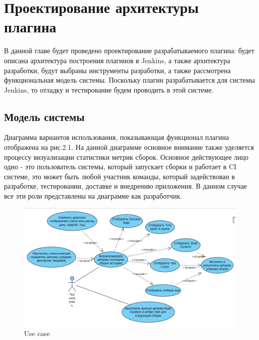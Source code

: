 \chapter{Проектирование архитектуры плагина} \label{ch2}
	
В данной главе будет проведено проектирование разрабатываемого плагина: будет описана архитектура построения плагинов в Jenkins, а также архитектура разработки, будут выбраны инструменты разработки, а также рассмотрена функциональная модель системы. Поскольку плагин разрабатывается для системы Jenkins, то отладку и тестирование будем проводить в этой системе.

\section{Модель системы} \label{ch1:sec1}

Диаграмма вариантов использования, показывающая функционал плагина отображена на рис.2.1. На данной диаграмме основное внимание также уделяется процессу визуализации статистики метрик сборок. Основное действующее лицо одно - это пользователь системы, который запускает сборки и работает в CI системе, это может быть любой участник команды, который задействован в разработке, тестировании, доставке и внедрению приложения. В данном случае все эти роли представлены на диаграмме как разработчик.

\begin{figure}[ht!] 
	\center
	\includegraphics [scale=0.7] {my_folder/images//usecase3}
	\caption{Use case } 
	\label{fig:usecase3}  
\end{figure}


